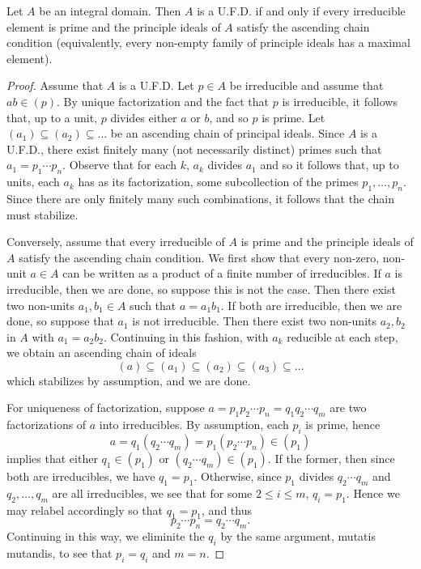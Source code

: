 \documentclass[10pt]{amsart}
\begin{document}
\begin{thm}
  Let $A$ be an integral domain.
  Then $A$ is a U.F.D. if and only if every irreducible element is prime and the principle ideals of $A$ satisfy the ascending chain condition (equivalently, every non-empty family of principle ideals has a maximal element).

  \begin{proof}
    Assume that $A$ is a U.F.D.
    Let $p \in A$ be irreducible and assume that $ab \in (p)$.
    By unique factorization and the fact that $p$ is irreducible, it follows that, up to a unit, $p$ divides either $a$ or $b$, and so $p$ is prime.
    Let $(a_1) \subseteq (a_2) \subseteq \ldots$ be an ascending chain of principal ideals.
    Since $A$ is a U.F.D., there exist finitely many (not necessarily distinct) primes such that $a_1 = p_1 \cdots p_n$.
    Observe that for each $k$, $a_k$ divides $a_1$ and so it follows that, up to units, each $a_k$ has as its factorization, some subcollection of the primes $p_1, \ldots, p_n$.
    Since there are only finitely many such combinations, it follows that the chain must stabilize.
    
    Conversely, assume that every irreducible of $A$ is prime and the principle ideals of $A$ satisfy the ascending chain condition.
    We first show that every non-zero, non-unit $a \in A$ can be written as a product of a finite number of irreducibles.
    If $a$ is irreducible, then we are done, so suppose this is not the case.
    Then there exist two non-units $a_1, b_1 \in A$ such that $a = a_1b_1$.
    If both are irreducible, then we are done, so suppose that $a_1$ is not irreducible.
    Then there exist two non-units $a_2, b_2$ in $A$ with $a_1 = a_2b_2$.
    Continuing in this fashion, with $a_k$ reducible at each step, we obtain an ascending chain of ideals
    $$(a) \subseteq (a_1) \subseteq (a_2) \subseteq (a_3) \subseteq \ldots$$
    which stabilizes by assumption, and we are done.
    
    For uniqueness of factorization, suppose $a = p_1 p_2 \cdots p_n = q_1 q_2 \cdots q_m$ are two factorizations of $a$ into irreducibles.
    By assumption, each $p_i$ is prime, hence 
    $$a = q_1(q_2 \cdots q_m) = p_1(p_2 \cdots p_n) \in (p_1)$$
    implies that either $q_1 \in (p_1)$ or $(q_2 \cdots q_m) \in (p_1)$.
    If the former, then since both are irreducibles, we have $q_1 = p_1$.
    Otherwise, since $p_1$ divides $q_2 \cdots q_m$ and $q_2, \ldots, q_m$ are all irreducibles, we see that for some $2 \leq i \leq m$, $q_i = p_1$.
    Hence we may relabel accordingly so that $q_1 = p_1$, and thus
    $$p_2 \cdots p_n = q_2 \cdots q_m.$$
    Continuing in this way, we eliminite the $q_i$ by the same argument, mutatis mutandis, to see that $p_i = q_i$ and $m = n$.
  \end{proof}
\end{thm}
\end{document}
